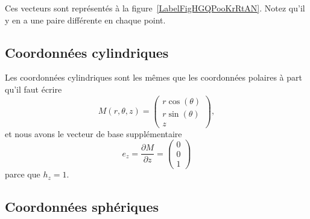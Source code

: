 Ces vecteurs sont représentés à la figure~\ref{LabelFigHGQPooKrRtAN}. Notez qu'il y en a une paire différente en chaque point.
\newcommand{\CaptionFigHGQPooKrRtAN}{En brun, les lignes que le point suivrait si on ne variait qu'une coordonnées polaires à la fois. Les vecteurs rouges sont les vecteurs $e_{r}$ et $e_{\theta}$.}


\subsection{Coordonnées cylindriques}

Les coordonnées cylindriques sont les mêmes que les coordonnées polaires à part qu'il faut écrire
\begin{equation}
    M(r,\theta,z)=\begin{pmatrix}
        r\cos(\theta)    \\
        r\sin(\theta)    \\
        z
    \end{pmatrix},
\end{equation}
et nous avons le vecteur de base supplémentaire
\begin{equation}
    e_z=\frac{ \partial M }{ \partial z }=\begin{pmatrix}
        0    \\
        0    \\
        1
    \end{pmatrix}
\end{equation}
parce que $h_z=1$.

\subsection{Coordonnées sphériques}

